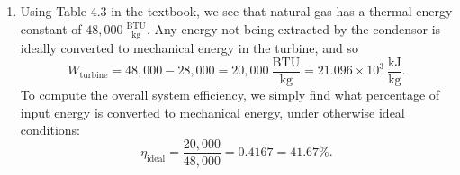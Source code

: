 \documentclass{article}
\begin{document}
\begin{enumerate}[label=\thesubsection]
\begin{enumerate}[label=\alph*)]
\[				\]
		\end{enumerate}
		\setcounter{subsection}{20}
	\item Using Table 4.3 in the textbook, we see that natural gas has a thermal energy constant of \(48,000 \ \mathrm{\frac{BTU}{kg}}\). Any energy not being extracted by the condensor is ideally converted to mechanical energy in the turbine, and so
		\[
			W_{\mathrm{turbine}} = 48,000 - 28,000 = 20,000 \ \mathrm{\frac{BTU}{kg}} = 21.096 \times 10^3 \ \mathrm{\frac{kJ}{kg}}.
		\]
		To compute the overall system efficiency, we simply find what percentage of input energy is converted to mechanical energy, under otherwise ideal conditions:
		\[
			\eta_{\mathrm{ideal}} = \frac{20,000}{48,000} = 0.4167 = 41.67\%.
		\]
\end{enumerate}
\end{document}
